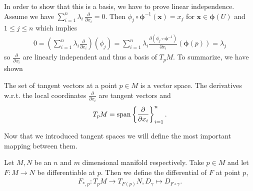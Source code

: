 \documentclass[../master_thesis.tex]{subfiles}
\begin{document}
In order to show that this is a basis, we have to prove linear independence.
Assume we have $\sum_{i=1}^n \lambda_i \, \frac{\partial}{\partial x_i} = 0$.
Then $\phi_j \circ \bm{\phi}^{-1} (\mathbf{x}) = x_j$ for $\mathbf{x} \in \bm{\phi}(U)$ and 
$1 \leq j \leq n$ 
which implies
\begin{align*}
    0 = \left( \sum\limits_{i=1}^n \lambda_i \frac{\partial}{\partial x_i}
        \right) (\phi_j)
    = \sum\limits_{i=1}^n \lambda_i \frac{\partial (\phi_j \circ \bm{\phi}^{-1})}{\partial x_i}(\bm{\phi}(p))
    = \lambda_j
\end{align*}
so $\frac{\partial}{\partial x_i}$ are
linearly independent and thus a basis of $T_p M$. To summarize, we have shown
\begin{proposition}
    The set of tangent vectors at a point $p \in M$ is a vector space. 
    The derivatives w.r.t. the local coordinates $\frac{\partial}{\partial x_i}$ 
    are tangent vectors and 
    \begin{align*}
        T_p M = \operatorname{span} \left\{ \frac{\partial}{\partial x_i} \right\} _{i=1}^n.
    \end{align*}
\end{proposition}

Now that we introduced tangent spaces we will define the most important 
mapping between them.
\begin{definition}[Differential]
    Let $M, N$ be an $n$ and $m$ dimensional manifold respectively. 
    Take $p \in M$ and let $F:M \rightarrow N$ be differentiable at $p$. 
    Then we define the differential of $F$ at point $p$,
    \begin{align*}
        F_{*,p}: T_p M \rightarrow T_{F(p)} N, D_\gamma \mapsto D_{F\circ \gamma}.
    \end{align*}
\end{definition}
\end{document}
